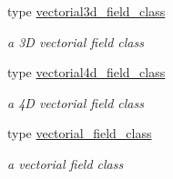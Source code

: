 \begin{DoxyCompactItemize}
type \mbox{\hyperlink{structfield__types__mod_1_1vectorial3d__field__class}{vectorial3d\+\_\+field\+\_\+class}}
\begin{DoxyCompactList}\small\item\em a 3D vectorial field class \end{DoxyCompactList}\item 
type \mbox{\hyperlink{structfield__types__mod_1_1vectorial4d__field__class}{vectorial4d\+\_\+field\+\_\+class}}
\begin{DoxyCompactList}\small\item\em a 4D vectorial field class \end{DoxyCompactList}\item 
type \mbox{\hyperlink{structfield__types__mod_1_1vectorial__field__class}{vectorial\+\_\+field\+\_\+class}}
\begin{DoxyCompactList}\small\item\em a vectorial field class \end{DoxyCompactList}\end{DoxyCompactItemize}
